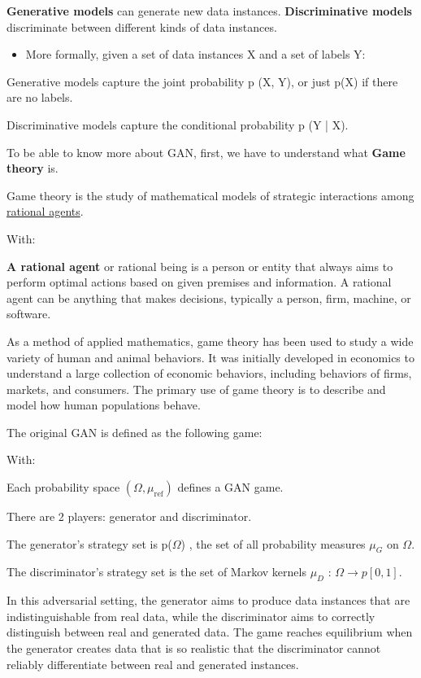 \documentclass{ieeeojies}
\begin{document}
\textbf{Generative models} can generate new data instances.
\textbf{Discriminative models} discriminate between different kinds of data instances.


\begin{itemize}
    \item  More formally, given a set of data instances X and a set of labels Y:
\end{itemize}

Generative models capture the joint probability p (X, Y), or just p(X) if there are no labels.

Discriminative models capture the conditional probability p (Y | X).

To be able to know more about GAN, first, we have to understand what \textbf{Game theory} is.

Game theory is the study of mathematical models of strategic interactions among \underline{rational agents}.

With:

\textbf{A rational agent} or rational being is a person or entity that
always aims to perform optimal actions based on given
premises and information. A rational agent can be anything
that makes decisions, typically a person, firm, machine, or
software.

As a method of applied mathematics, game theory has been used to study a wide variety of human and animal behaviors. It was initially developed in economics to understand a large collection of economic behaviors, including behaviors of firms, markets, and consumers. The primary use of game theory is to describe and model how human populations behave.

The original GAN is defined as the following game:

With:

Each probability space $(\Omega, \mu_{\text{ref}})$ defines a GAN game.

There are 2 players: generator and discriminator.

The generator's strategy set is p($\Omega$) , the set of all probability measures $\mu_G$ on $\Omega$.

The discriminator's strategy set is the set of Markov kernels $\mu_D$ : $\Omega \to p[0,1]$.

In this adversarial setting, the generator aims to produce data instances that are indistinguishable from real data, while the discriminator aims to correctly distinguish between real and generated data. The game reaches equilibrium when the generator creates data that is so realistic that the discriminator cannot reliably differentiate between real and generated instances.
\end{document}
